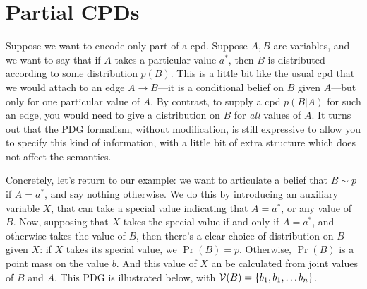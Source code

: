 \documentclass{article}
\title{}
\author{}
\date{May 2021}
\begin{document}
	\section{Partial CPDs}
	Suppose we want to encode only part of a cpd. Suppose $A, B$ are variables, and we want to say that if $A$ takes a particular value $a^*$, then $B$ is distributed according to some distribution $p(B)$. 	
	This is a little bit like the usual cpd that we would attach to an edge $A \to B$---it is a conditional belief on $B$ given $A$---but only for one particular value of $A$. By contrast, to supply a cpd $p(B | A)$ for such an edge, you would need to give a distribution on $B$ for \emph{all} values of $A$.
	It turns out that the PDG formalism, without modification, is still expressive to allow you to specify this kind of information, with a little bit of extra structure which does not affect the semantics.
	
	Concretely, let's return to our example: we want to articulate a belief that $B \sim p$ if $A = a^*$, and say nothing otherwise.  We do this by introducing an auxiliary variable $X$, that can take a special value indicating that $A = a^*$, or any value of $B$. Now, supposing that $X$ takes the special value if and only if $A=a^*$, and otherwise takes the value of $B$, then there's a clear choice of distribution on $B$ given $X$: if $X$ takes its special value, we $\Pr(B) = p$. Otherwise, $\Pr(B)$ is a point mass on the value $b$. And this value of $X$ an be calculated from joint values of $B$ and $A$.  This PDG is illustrated below, with $\mathcal V(B) = \{b_1, b_1, \ldots b_n\}$.
	
\end{document}
